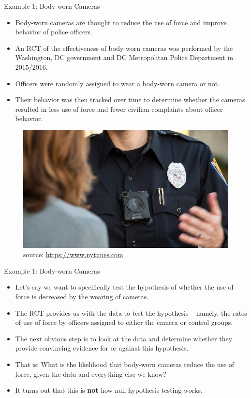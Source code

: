 \documentclass[handout]{beamer}
\begin{document}
\begin{frame}{Example 1: Body-worn Cameras}
\scriptsize{
\begin{itemize}
 \item Body-worn cameras are thought to reduce the use of force and improve behavior of police officers. 

 \item An  RCT of the effectiveness of body-worn cameras was performed by the Washington, DC government and DC Metropolitan Police Department in 2015/2016.
 \item Officers were randomly assigned to wear a body-worn camera or not.
 \item Their behavior was then tracked over time to determine whether the cameras resulted in less use of force and fewer civilian complaints about officer behavior.
 \end{itemize}

 \begin{figure}[h!]
	\centering
	\includegraphics[scale=0.25]{pics/camera.png}
	\caption{source: \url{https://www.nytimes.com}}
\end{figure}

} 
\end{frame}


\begin{frame}{Example 1: Body-worn Cameras}
\scriptsize{
\begin{itemize}
 \item Let's say we want to specifically test the hypothesis of whether the use of force is decreased by the wearing of cameras. 
 \item The RCT provides us with the data to test the hypothesis – namely, the rates of use of force by officers assigned to either the camera or control groups. 
 \item The next obvious step is to look at the data and determine whether they provide convincing evidence for or against this hypothesis. 
 \item That is: What is the likelihood that body-worn cameras reduce the use of force, given the data and everything else we know?
\item It turns out that this is \textbf{not} how null hypothesis testing works. 

\end{itemize}


} 
\end{frame}
\end{document}
